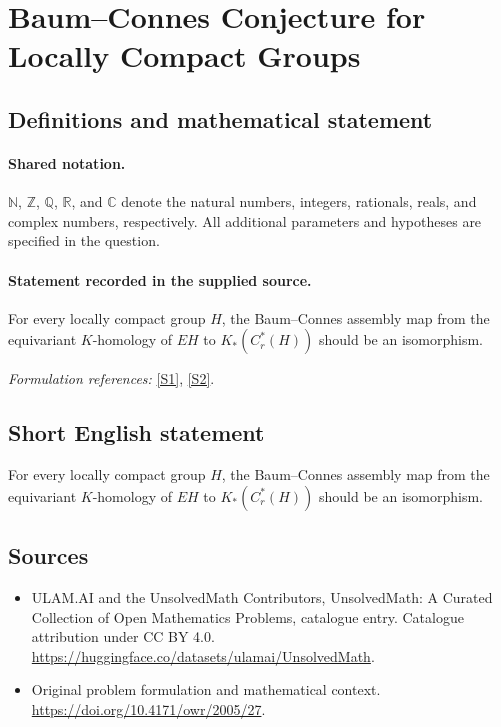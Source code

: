 \documentclass[11pt]{article}
\newcommand{\sref}[2]{\hyperlink{source:#1:#2}{[S#2]}}
\begin{document}
\section{Baum–Connes Conjecture for Locally Compact Groups}\label{statement}

\subsection{Definitions and mathematical statement}

\paragraph{Shared notation.}$\mathbb N$, $\mathbb Z$, $\mathbb Q$, $\mathbb R$, and $\mathbb C$ denote the natural numbers, integers, rationals, reals, and complex numbers, respectively. All additional parameters and hypotheses are specified in the question.


\paragraph{Statement recorded in the supplied source.}
For every locally compact group $H$, the Baum–Connes assembly map from the equivariant $K$-homology of $EH$ to $K_*(C_r^*(H))$ should be an isomorphism.
\par\smallskip\textit{Formulation references:} \sref{statement}{1}, \sref{statement}{2}.
\subsection{Short English statement}
For every locally compact group $H$, the Baum–Connes assembly map from the equivariant $K$-homology of $EH$ to $K_*(C_r^*(H))$ should be an isomorphism.
\subsection{Sources}
\begin{itemize}
\item[\hypertarget{source:statement:1}{S1}] ULAM.AI and the UnsolvedMath Contributors, UnsolvedMath: A Curated Collection of Open Mathematics Problems, catalogue entry. Catalogue attribution under CC BY 4.0.
\url{https://huggingface.co/datasets/ulamai/UnsolvedMath}.
\item[\hypertarget{source:statement:2}{S2}] Original problem formulation and mathematical context.
\url{https://doi.org/10.4171/owr/2005/27}.
\end{itemize}
\label{end:statement}
\end{document}
